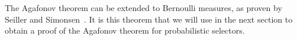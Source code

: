 \documentclass[11pt]{article}
\newtheorem{lemma}{Lemma}
\newcommand{\A}{\mathcal{A}}
\DeclareMathOperator{\freq}{Freq}
\DeclareMathOperator{\bfreq}{BFreq}
\begin{document}
%
%
%
%
%


The Agafonov theorem can be extended to Bernoulli measures, as proven by Seiller and Simonsen~\cite{SeillerS2020}. It is this theorem that we will use in the next section to obtain a proof of the Agafonov theorem for probabilistic selectors. 




%
%
%
%
%
%
%
\end{document}
